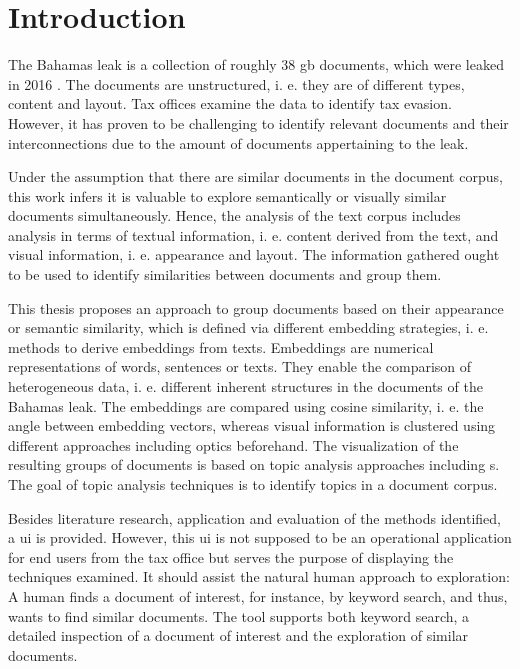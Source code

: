 \chapter{Introduction}\label{ch:introduction}

The Bahamas leak is a collection of roughly 38 \ac{gb} documents, which were leaked in 2016 \cite{data-corpus-bahamas-leaks}.
The documents are unstructured, i. e. they are of different types, content and layout.
Tax offices examine the data to identify tax evasion.
However, it has proven to be challenging to identify relevant documents and their interconnections due to the amount of documents appertaining to the leak.

Under the assumption that there are similar documents in the document corpus, 
this work infers it is valuable to explore semantically or visually similar documents simultaneously.
Hence, the analysis of the text corpus includes analysis in terms of textual information, i. e. content derived from the text, 
and visual information, i. e. appearance and layout.
The information gathered ought to be used to identify similarities between documents and group them.

This thesis proposes an approach to group documents based on their appearance or semantic similarity, 
which is defined via different embedding strategies, i. e. methods to derive embeddings from texts.
Embeddings are numerical representations of words, sentences or texts.
They enable the comparison of heterogeneous data, i. e. different inherent structures in the documents of the Bahamas leak.
The embeddings are compared using cosine similarity, i. e. the angle between embedding vectors, 
whereas visual information is clustered using different approaches including \ac{optics} beforehand.
The visualization of the resulting groups of documents is based on topic analysis approaches including \wordcloud{}s.
The goal of topic analysis techniques is to identify topics in a document corpus.

Besides literature research, application and evaluation of the methods identified, 
a \ac{ui} is provided.
However, this \ac{ui} is not supposed to be an operational application for end users from the tax office 
but serves the purpose of displaying the techniques examined.
It should assist the natural human approach to exploration:
A human finds a document of interest, for instance, by keyword search, and thus, wants to find similar documents.
The tool supports both keyword search, a detailed inspection of a document of interest and the exploration of similar documents.
